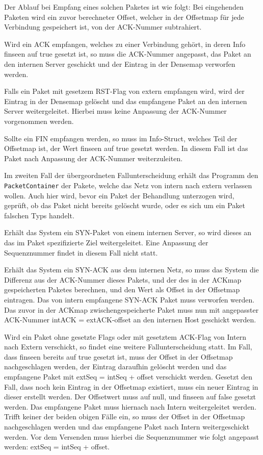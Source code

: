 \documentclass[../review_2.tex]{subfiles}
\begin{document}
Der Ablauf bei Empfang eines solchen Paketes ist wie folgt: Bei eingehenden Paketen wird ein zuvor berechneter Offset, welcher in der Offsetmap für jede Verbindung gespeichert ist, von der ACK-Nummer subtrahiert.

Wird ein ACK empfangen, welches zu einer Verbindung gehört, in deren Info finseen auf true gesetzt ist, so muss die ACK-Nummer angepasst, das Paket an den internen Server geschickt und der Eintrag in der Densemap verworfen werden.

Falls ein Paket mit gesetzem RST-Flag von extern empfangen wird, wird der Eintrag in der Densemap gelöscht und das empfangene Paket an den internen Server weitergeleitet. Hierbei muss keine Anpassung der ACK-Nummer vorgenommen werden.

Sollte ein FIN empfangen werden, so muss im Info-Struct, welches Teil der Offsetmap ist, der Wert finseen auf true gesetzt werden. In diesem Fall ist das Paket nach Anpassung der ACK-Nummer weiterzuleiten.



Im zweiten Fall der übergeordneten Fallunterscheidung erhält das Programm den \texttt{PacketContainer} der Pakete, welche das Netz von intern nach extern verlassen wollen. Auch hier wird, bevor ein Paket der Behandlung unterzogen wird, geprüft, ob das Paket nicht bereits gelöscht wurde, oder es sich um ein Paket falschen Typs handelt.

Erhält das System ein SYN-Paket von einem internen Server, so wird dieses an das im Paket spezifizierte Ziel weitergeleitet. Eine Anpassung der Sequenznummer findet in diesem Fall nicht statt.

Erhält das System ein SYN-ACK aus dem internen Netz, so muss das System die Differenz aus der ACK-Nummer dieses Pakets, und der des in der ACKmap gespeicherten Paketes berechnen, und den Wert als Offset in der Offsetmap eintragen. Das von intern empfangene SYN-ACK Paket muss verworfen werden.
Das zuvor in der ACKmap zwischengespeicherte Paket muss nun mit angepasster ACK-Nummer intACK = extACK-offset an den internen Host geschickt werden.

Wird ein Paket ohne gesetzte Flags oder mit gesetztem ACK-Flag von Intern nach Extern verschickt, so findet eine weitere Fallunterscheidung statt.
Im Fall, dass finseen bereits auf true gesetzt ist, muss der Offset in der Offsetmap nachgeschlagen werden, der Eintrag daraufhin gelöscht werden und das empfangene Paket mit extSeq = intSeq + offset verschickt werden.
Gesetzt den Fall, dass noch kein Eintrag in der Offsetmap existiert, muss ein neuer Eintrag in dieser erstellt werden. Der Offsetwert muss auf null, und finseen auf false gesetzt werden. Das empfangene Paket muss hiernach nach Intern weitergeleitet werden.
Trifft keiner der beiden obigen Fälle ein, so muss der Offset in der Offsetmap nachgeschlagen werden und das empfangene Paket nach Intern weitergeschickt werden. Vor dem Versenden muss hierbei die Sequenznummer wie folgt angepasst werden: extSeq = intSeq + offset.
\end{document}
